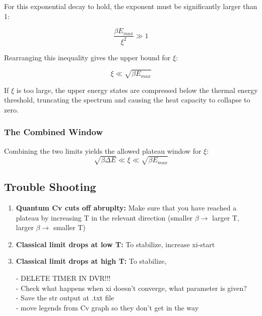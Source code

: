 \documentclass{article}
\numberwithin{equation}{subsection}
\begin{document}
For this exponential decay to hold, the exponent must be significantly larger than 1:

\begin{equation}
\frac{\beta E_{max}}{\xi^2} \gg 1
\end{equation}

Rearranging this inequality gives the upper bound for $\xi$:

\begin{equation}
\xi \ll \sqrt{\beta E_{max}}
\end{equation}

If $\xi$ is too large, the upper energy states are compressed below the thermal energy threshold, truncating the spectrum and causing the heat capacity to collapse to zero.

\subsubsection*{The Combined Window}Combining the two limits yields the allowed plateau window for $\xi$:\begin{equation}\sqrt{\beta \Delta E} \ll \xi \ll \sqrt{\beta E_{max}}\end{equation}

\subsection{Trouble Shooting}

\begin{enumerate}
    \item \textbf{Quantum Cv cuts off abruplty:}
    Make sure that you have reached a plateau by increasing T in the relevant direction (smaller $\beta \rightarrow$ larger T, larger $\beta \rightarrow$ smaller T)
    
    \item \textbf{Classical limit drops at low T:}
    To stabilize, increase xi-start
    
    \item \textbf{Classical limit drops at high T:}
    To stabilize,

    - DELETE TIMER IN DVR!!! \\
    - Check what happens when xi doesn't converge, what parameter is given? \\
    - Save the str output at .txt file \\
    - move legends from Cv graph so they don't get in the way
\end{enumerate}




\end{document}
